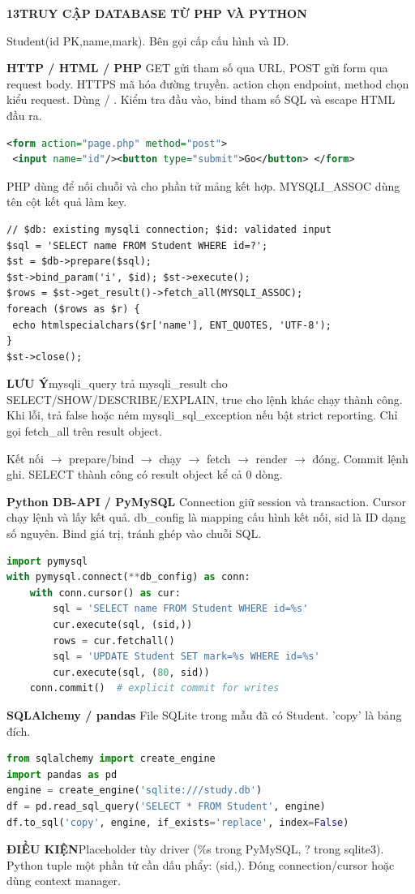 \documentclass[a4paper]{article}
\newcommand{\sqlfont}{\ttfamily}
\newcommand{\bodyfontsize}{5.55}
\newcommand{\bodyleading}{5.2}
\newcommand{\bodylineskiplimit}{-2pt}
\newcommand{\bodystyle}{%
  \fontsize{\bodyfontsize}{\bodyleading}\selectfont\setlength{\lineskiplimit}{\bodylineskiplimit}\RaggedRight
  \setlength{\abovedisplayskip}{.5pt}\setlength{\belowdisplayskip}{.5pt}%
  \setlength{\abovedisplayshortskip}{.3pt}\setlength{\belowdisplayshortskip}{.3pt}}
\newcommand{\topic}[2]{\par\addvspace{.45pt}\nointerlineskip%
  \begingroup\setlength{\fboxsep}{0.35pt}%
  \noindent\colorbox{structure}{\parbox{\dimexpr\linewidth-2\fboxsep\relax}{%
    \color{white}\fontsize{6.45}{6.8}\selectfont\bfseries #1\enspace #2}}%
  \endgroup\par\nobreak\vspace{.55pt}\nointerlineskip\nobreak}
\newenvironment{topicblock}
  {\par\bodystyle}
  {\par}
\newcommand{\key}[1]{\par\textcolor{structure}{\textbf{#1}}\enspace}
\newcommand{\note}[4]{\par\nointerlineskip\vspace{.25pt}\begingroup\setlength{\fboxsep}{0.1pt}%
  \noindent\colorbox{#1}{\parbox{\dimexpr\linewidth-2\fboxsep\relax}{%
    \RaggedRight\textcolor{#2}{\textbf{#3}}\enspace #4}}%
  \endgroup\par\nointerlineskip\vspace{.25pt}}
\newcommand{\cond}[1]{\note{conditionbg}{condition}{ĐIỀU KIỆN}{#1}}
\newcommand{\trap}[1]{\note{warningbg}{warning}{LƯU Ý}{#1}}
\newcommand{\sql}[1]{{\sqlfont\color{sqltext}\detokenize{#1}}}
\newlength{\sheetwidth}
\newenvironment{sheetcolumns}[1]
  {\noindent\begin{minipage}[t]{#1\sheetwidth}\vspace{0pt}\bodystyle\ignorespaces}
  {\end{minipage}\par}
\begin{document}
\begin{sheetcolumns}{.258}
\begin{topicblock}
\topic{13}{TRUY CẬP DATABASE TỪ PHP VÀ PYTHON}
Student(id PK,name,mark). Bên gọi cấp cấu hình và ID.
\key{HTTP / HTML / PHP}
GET gửi tham số qua URL, POST gửi form qua request body. HTTPS mã hóa đường truyền. action chọn endpoint, method chọn kiểu request. Dùng \sql{$_GET['id']} / \sql{$_POST['id']}. Kiểm tra đầu vào, bind tham số SQL và escape HTML đầu ra.
\begin{lstlisting}[style=Plaincode,language=XML]
<form action="page.php" method="post">
 <input name="id"/><button type="submit">Go</button> </form>
\end{lstlisting}
PHP dùng \sql{.} để nối chuỗi và \sql{key => value} cho phần tử mảng kết hợp. MYSQLI\_ASSOC dùng tên cột kết quả làm key.
\begin{lstlisting}[style=PHPcode,language=PHPx]
// $db: existing mysqli connection; $id: validated input
$sql = 'SELECT name FROM Student WHERE id=?';
$st = $db->prepare($sql);
$st->bind_param('i', $id); $st->execute();
$rows = $st->get_result()->fetch_all(MYSQLI_ASSOC);
foreach ($rows as $r) {
 echo htmlspecialchars($r['name'], ENT_QUOTES, 'UTF-8');
}
$st->close();
\end{lstlisting}
\trap{mysqli\_query trả mysqli\_result cho SELECT/SHOW/DESCRIBE/EXPLAIN, true cho lệnh khác chạy thành công. Khi lỗi, trả false hoặc ném mysqli\_sql\_exception nếu bật strict reporting. Chỉ gọi fetch\_all trên result object.}
Kết nối $\to$ prepare/bind $\to$ chạy $\to$ fetch $\to$ render $\to$ đóng. Commit lệnh ghi. SELECT thành công có result object kể cả 0 dòng.
\key{Python DB-API / PyMySQL}
Connection giữ session và transaction. Cursor chạy lệnh và lấy kết quả. db\_config là mapping cấu hình kết nối, sid là ID dạng số nguyên. Bind giá trị, tránh ghép vào chuỗi SQL.
\begin{lstlisting}[style=Plaincode,language=Python]
import pymysql
with pymysql.connect(**db_config) as conn:
    with conn.cursor() as cur:
        sql = 'SELECT name FROM Student WHERE id=%s'
        cur.execute(sql, (sid,))
        rows = cur.fetchall()
        sql = 'UPDATE Student SET mark=%s WHERE id=%s'
        cur.execute(sql, (80, sid))
    conn.commit()  # explicit commit for writes
\end{lstlisting}
\key{SQLAlchemy / pandas}
File SQLite trong mẫu đã có Student. 'copy' là bảng đích.
\begin{lstlisting}[style=Plaincode,language=Python]
from sqlalchemy import create_engine
import pandas as pd
engine = create_engine('sqlite:///study.db')
df = pd.read_sql_query('SELECT * FROM Student', engine)
df.to_sql('copy', engine, if_exists='replace', index=False)
\end{lstlisting}
\cond{Placeholder tùy driver (\%s trong PyMySQL, ? trong sqlite3). Python tuple một phần tử cần dấu phẩy: (sid,). Đóng connection/cursor hoặc dùng context manager.}
\end{topicblock}


\end{sheetcolumns}
\end{document}
